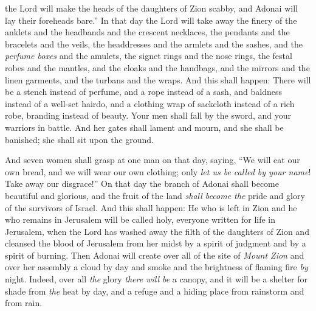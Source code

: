 \begin{biblechapter}
\verse the Lord will make the heads of the daughters of Zion scabby, 
and Adonai will lay their foreheads bare.”
\verse In that day the Lord will take away the finery of the anklets 
and the headbands and the crescent necklaces,
\verse the pendants and the bracelets and the veils,
\verse the headdresses and the armlets and the sashes, 
and the \textit{perfume boxes} and the amulets,
\verse the signet rings and the nose rings,
\verse the festal robes and the mantles, 
and the cloaks and the handbags,
\verse and the mirrors and the linen garments, 
and the turbans and the wraps.
\verse And this shall happen: There will be 
a stench instead of perfume, 
and a rope instead of a sash, 
and baldness instead of a well-set hairdo, 
and a clothing wrap of sackcloth instead of a rich robe, 
branding instead of beauty.
\verse Your men shall fall by the sword, 
and your warriors in battle.
\verse And her gates shall lament and mourn, 
and she shall be banished; 
she shall sit upon the ground.
\end{biblechapter}

\begin{biblechapter} %
\verse And seven women shall grasp at one man on that day, saying, 
“We will eat our own bread, 
and we will wear our own clothing; 
only \textit{let us be called by your name}! 
Take away our disgrace!”
 On that day the branch of Adonai shall become beautiful and glorious, 
and the fruit of the land \textit{shall become the} pride and glory of the survivors of Israel.
\verse And this shall happen: He who is left in Zion 
and he who remains in Jerusalem will be called holy, 
everyone written for life in Jerusalem,
\verse when the Lord has washed away the filth of the daughters of Zion 
and cleansed the blood of Jerusalem from her midst 
by a spirit of judgment 
and by a spirit of burning.
\verse Then Adonai will create over all of the site of \textit{Mount Zion} 
and over her assembly a cloud by day 
and smoke and the brightness of flaming fire \textit{by} night. 
Indeed, over all \textit{the} glory \textit{there will be} a canopy,
\verse and it will be a shelter for shade from \textit{the} heat by day, 
and a refuge and a hiding place from rainstorm and from rain.
\end{biblechapter}

